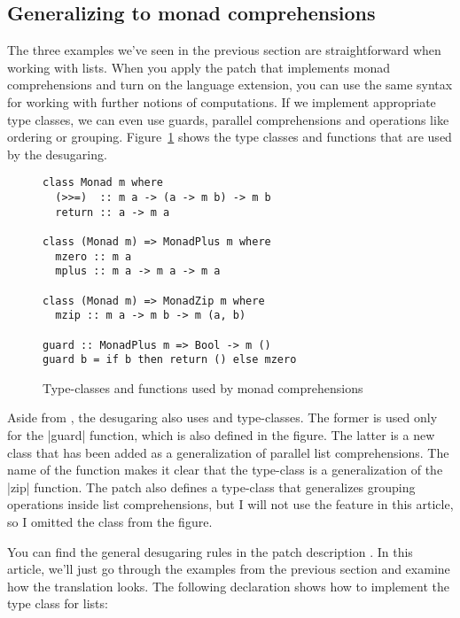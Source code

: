 \documentclass{tmr}
\begin{document}

\subsection{Generalizing to monad comprehensions}
The three examples we've seen in the previous section are straightforward when working with lists.
When you apply the patch that implements monad comprehensions \cite{bringbackmc} and turn on the
 language extension, you can use the same syntax for working
with further notions of computations. If we implement appropriate type classes, we can even use 
guards, parallel comprehensions and operations like ordering or grouping. 
Figure~\ref{fig:monad-defs} shows the type classes and functions that are used by the desugaring.

\begin{figure}
\begin{verbatim}
class Monad m where
  (>>=)  :: m a -> (a -> m b) -> m b
  return :: a -> m a

class (Monad m) => MonadPlus m where
  mzero :: m a
  mplus :: m a -> m a -> m a

class (Monad m) => MonadZip m where
  mzip :: m a -> m b -> m (a, b)

guard :: MonadPlus m => Bool -> m ()
guard b = if b then return () else mzero
\end{verbatim}
\caption{Type-classes and functions used by monad comprehensions}
\label{fig:monad-defs}
\end{figure}

Aside from , the desugaring also uses  and  
type-classes. The former is used only for the |guard| function, which is also defined in the 
figure. The latter is a new class that has been added as a generalization of parallel
list comprehensions. The name of the function makes it clear that the type-class is a generalization
of the |zip| function. The patch also defines a  type-class that generalizes 
grouping operations inside list comprehensions, but I will not use the feature in this article, 
so I omitted the class from the figure.

You can find the general desugaring rules in the patch description \cite{bringbackmc}. In this 
article, we'll just go through the examples from the previous section and examine how the 
translation looks. The following declaration shows how to implement the  type class
for lists:
\end{document}
